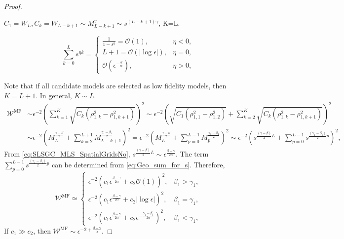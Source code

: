 \begin{proof}\label{eq:Sample_cost_est}

$C_1=W_L, C_k = W_{L-k+1}\sim M_{L-k+1}^\gamma\sim s^{(L-k+1)\gamma}$, K=L.

%
\begin{equation}
\label{eq:Geo_sum_for_s}
\sum_{k=0}^L s^{\eta k}=\left\{\begin{array}{ll}
\frac{1}{1-s^{\eta}}=\mathcal{O}\left(1\right), & \eta<0,\\
L+1 = \mathcal{O}\left(|\log \epsilon|\right), & \eta = 0,\\
\mathcal{O}\left(\epsilon^{-\frac{\eta}{\alpha}}\right), & \eta>0,
\end{array}
\right.
\end{equation}
%

Note that if all candidate models are selected as low fidelity models, then $K=L+1$. In general, $K\sim L$.
%
\begin{align*}
    \mathcal{W}^\text{MF} &\sim \epsilon^{-2} \left(\sum_{k=1}^K\sqrt{C_k\left(\rho_{1,k}^2 - \rho_{1,k+1}^2\right)}\right)^2 \sim \epsilon^{-2}\left(\sqrt{C_1\left(\rho_{1,1}^2 - \rho_{1,2}^2\right)}+\sum_{k=2}^K \sqrt{C_k\left(\rho_{1,k}^2 - \rho_{1,k+1}^2\right)} \right)^2\\
    &\sim \epsilon^{-2} \left(M_L^{\frac{\gamma-\beta}{2}}+\sum_{k=2}^{L+1}M_{L-k+1}^\frac{\gamma_1-\beta_1}{2}\right)^2=\epsilon^{-2} \left(M_L^{\frac{\gamma-\beta}{2}}+\sum_{p=0}^{L-1}M_{p}^\frac{\gamma_1-\beta_1}{2}\right)^2\sim \epsilon^{-2}\left(s^{\frac{(\gamma-\beta)}{2}L}+\sum_{p=0}^{L-1}s^{\frac{(\gamma_1-\beta_1)}{2}p}\right)^2,
\end{align*}
%
From \eqref{eq:SLSGC_MLS_SpatialGridsNo}, $s^{\frac{(\gamma-\beta)}{2}L}\sim \epsilon^{\frac{\beta-\gamma}{2\alpha}}$. The term $\sum_{p=0}^{L-1}s^{\frac{(\gamma_1-\beta_1)}{2}p}$ can be determined from \eqref{eq:Geo_sum_for_s}. Therefore, 
\[
\mathcal{W}^\text{MF} \simeq \left\{\begin{array}{ll}
\epsilon^{-2}\left(c_1\epsilon^{\frac{\beta-\gamma}{2\alpha}}+c_2\mathcal{O}(1)\right)^2, & \beta_1>\gamma_1,\\
\epsilon^{-2}\left(c_1\epsilon^{\frac{\beta-\gamma}{2\alpha}}+c_2|\log\epsilon|\right)^2, & \beta_1=\gamma_1,\\
\epsilon^{-2}\left(c_1\epsilon^{\frac{\beta-\gamma}{2\alpha}}+c_2\epsilon^{-\frac{\gamma_1-\beta_1}{2\alpha}}\right)^2, & \beta_1<\gamma_1,
\end{array}
\right.
\]
If $c_1\gg c_2$, then $\mathcal{W}^\text{MF} \sim \epsilon^{-2+\frac{\beta-\gamma}{\alpha}}$.



\end{proof}
